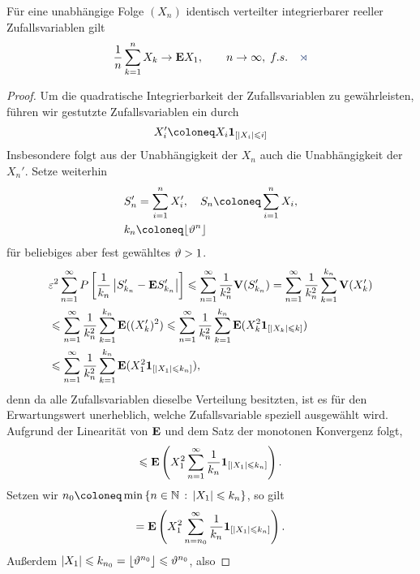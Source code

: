 \begin{prop}
\label{prop:8.3}
Für eine unabhängige Folge $(X_n)$ identisch verteilter integrierbarer reeller
Zufallsvariablen gilt
\begin{align*}
\frac{1}{n}\sum\limits_{k=1}^n X_k \to \E X_1,\qquad n\to \infty,\;
f.s.\fishhere
\end{align*}
\end{prop}
\begin{proof}
Um die quadratische Integrierbarkeit der Zufallsvariablen zu
gewährleisten, führen wir gestutzte Zufallsvariablen ein durch
\begin{align*}
X_i' \defl X_i\Id_{[\abs{X_i}\le i]}
\end{align*}
Insbesondere folgt aus der Unabhängigkeit der $X_n$ auch die Unabhängigkeit der
$X_n'$. Setze weiterhin
\begin{align*}
&S_n' = \sum\limits_{i=1}^n X_i',\quad
S_n \defl \sum\limits_{i=1}^n X_i,\\
&k_n \defl \lfloor \th^n\rfloor 
\end{align*}
für beliebiges aber fest gewähltes $\vartheta>1$.
\begin{align*}
&\varepsilon^2\sum\limits_{n=1}^\infty P\left[ \frac{1}{k_n}\left|S_{k_n}'-\textbf{E} S_{k_n}'\right|
\right] 
\leqslant \sum\limits_{n=1}^\infty \frac{1}{k_n^2}\textbf{V}(S_{k_n}')
= \sum\limits_{n=1}^\infty \frac{1}{k_n^2} \sum\limits_{k=1}^{k_n} \textbf{V}(X_k')\\
&\leqslant \sum\limits_{n=1}^\infty \frac{1}{k_n^2} \sum\limits_{k=1}^{k_n} \textbf{E}
((X_k')^2)
\leqslant 
\sum\limits_{n=1}^\infty \frac{1}{k_n^2} \sum\limits_{k=1}^{k_n} \textbf{E}
(X_k^2\mathbf{1}_{[\left|X_k\right|\leqslant k]})\\
&\leqslant 
\sum\limits_{n=1}^\infty \frac{1}{k_n^2} \sum\limits_{k=1}^{k_n} \textbf{E}
(X_1^2\mathbf{1}_{[\left|X_1\right|\leqslant k_n]}),
\end{align*}
denn da alle Zufallsvariablen dieselbe Verteilung besitzten, ist es
für den Erwartungswert unerheblich, welche Zufallsvariable speziell ausgewählt
wird. Aufgrund der Linearität von $\textbf{E}$ und dem Satz der monotonen Konvergenz
folgt,
\begin{align*}
\leqslant
\textbf{E}\left(X_1^2 \sum\limits_{n=1}^\infty \frac{1}{k_n}
\mathbf{1}_{[\left|X_1\right|\leqslant k_n]}\right).
\end{align*}
Setzen wir $n_0 \defl \min\setdef{n\in\N}{\abs{X_1}\le k_n}$, so gilt
\begin{align*}
=
\textbf{E}\left(X_1^2 \sum\limits_{n=n_0}^\infty \frac{1}{k_n}
\mathbf{1}_{[\left|X_1\right|\leqslant k_n]}\right).
\end{align*}
Außerdem $\left|X_1\right|\leqslant k_{n_0} = \lfloor \vartheta^{n_0} \rfloor \leqslant \vartheta^{n_0}$, also

\end{proof}
